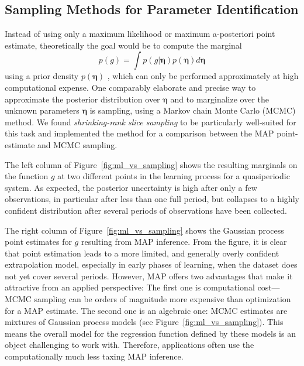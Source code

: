 \subsection{Sampling Methods for Parameter Identification}

Instead of using only a maximum likelihood or maximum a-posteriori point
estimate, theoretically the goal would be to compute the marginal
\vspace{-\baselineskip}
\begin{equation}
  p(g) = \int p(g|\boldsymbol{\eta}) p(\boldsymbol{\eta}) d\boldsymbol{\eta}
\end{equation}
using a prior density $p(\boldsymbol{\eta})$
\cite[]{Rasmussen.Williams:2006:Gaussian},
which can only be performed approximately at high computational expense. One
comparably elaborate and precise way to approximate the posterior distribution
over $\boldsymbol{\eta}$ and to marginalize over the unknown
parameters $\boldsymbol{\eta}$ is sampling,
using a Markov chain Monte Carlo (MCMC) method. We found \emph{shrinking-rank
slice sampling} \cite{Thompson.Neal:2010:Slice} to be particularly well-suited
for this task and implemented the method for a comparison between the MAP
point-estimate and MCMC sampling.

The left column of Figure~\ref{fig:ml_vs_sampling} shows the resulting marginals
on the function $g$ at two different points in the learning process for a
quasiperiodic system. As expected, the posterior uncertainty is high after
only a few observations, in particular after less than one full period, but
collapses to a highly confident distribution after several periods of
observations have been collected.

The right column of Figure~\ref{fig:ml_vs_sampling} shows the Gaussian process
point estimates for $g$ resulting from MAP inference. From the figure, it is
clear that point estimation leads to a more limited, and generally overly
confident extrapolation model, especially in early phases of learning, when the
dataset does not yet cover several periods. However, MAP offers two advantages
that make it attractive from an applied perspective: The first one is
computational cost---MCMC sampling can be orders of magnitude more expensive
than optimization for a MAP estimate. The second one is an algebraic one: MCMC
estimates are mixtures of Gaussian process models (see
Figure~\ref{fig:ml_vs_sampling}). This means the overall model for the
regression function defined by these models is an object challenging to work
with. Therefore, applications often use the computationally much less taxing MAP
inference.

